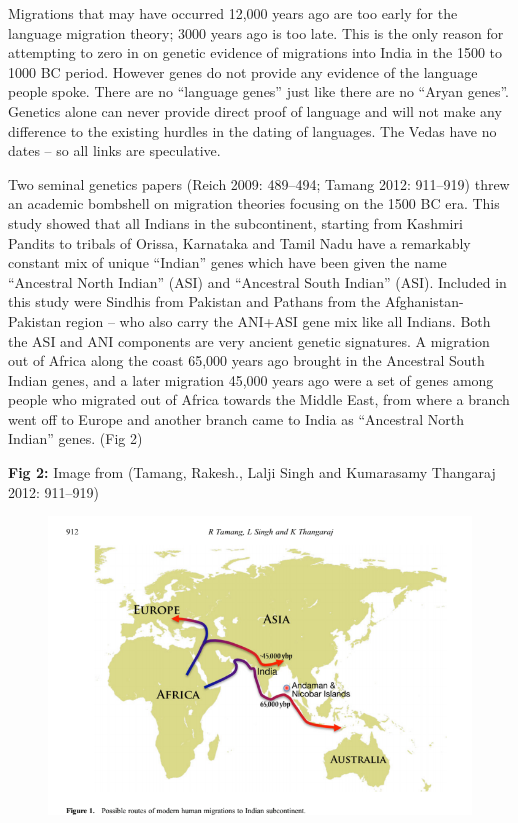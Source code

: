 Migrations that may have occurred 12,000 years ago are too early for the language migration theory; 3000 years ago is too late. This is the only reason for attempting to zero in on genetic evidence of migrations into India in the 1500 to 1000 BC period. However genes do not provide any evidence of the language people spoke. There are no “language genes” just like there are no “Aryan genes”. Genetics alone can never provide direct proof of language and will not make any difference to the existing hurdles in the dating of languages. The Vedas have no dates – so all links are speculative.

Two seminal genetics papers (Reich 2009: 489–494; Tamang 2012: 911–919) threw an academic bombshell on migration theories focusing on the 1500 BC era. This study showed that all Indians in the subcontinent, starting from Kashmiri Pandits to tribals of Orissa, Karnataka and Tamil Nadu have a remarkably constant mix of unique “Indian” genes which have been given the name “Ancestral North Indian” (ASI) and “Ancestral South Indian” (ASI). Included in this study were Sindhis from Pakistan and Pathans from the Afghanistan-Pakistan region – who also carry the ANI+ASI gene mix like all Indians. Both the ASI and ANI components are very ancient genetic signatures. A migration out of Africa along the coast 65,000 years ago brought in the Ancestral South Indian genes, and a later migration 45,000 years ago were a set of genes among people who migrated out of Africa towards the Middle East, from where a branch went off to Europe and another branch came to India as “Ancestral North Indian” genes. (Fig 2)

\textbf{Fig 2:} Image from (Tamang, Rakesh., Lalji Singh and Kumarasamy Thangaraj 2012: 911–919)

\begin{figure}
\includegraphics{"images/7-02.jpg"}
\end{figure}

